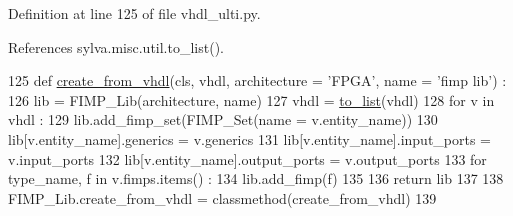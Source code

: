Definition at line 125 of file vhdl\+\_\+ulti.\+py.



References sylva.\+misc.\+util.\+to\+\_\+list().


\begin{DoxyCode}
125 \textcolor{keyword}{def }\hyperlink{namespacesylva_1_1misc_1_1vhdl__ulti_aeb869044a3abdaed35a68feec0f779fa}{create\_from\_vhdl}(cls, vhdl, architecture = 'FPGA', name = 'fimp lib') :
126   lib = FIMP\_Lib(architecture, name)
127   vhdl = \hyperlink{namespacesylva_1_1misc_1_1util_a03f5cfd365a10a5ec0567e320f987a9b}{to\_list}(vhdl)
128   \textcolor{keywordflow}{for} v \textcolor{keywordflow}{in} vhdl :
129     lib.add\_fimp\_set(FIMP\_Set(name = v.entity\_name))
130     lib[v.entity\_name].generics = v.generics
131     lib[v.entity\_name].input\_ports = v.input\_ports
132     lib[v.entity\_name].output\_ports = v.output\_ports
133     \textcolor{keywordflow}{for} type\_name, f \textcolor{keywordflow}{in} v.fimps.items() :
134       lib.add\_fimp(f)
135 
136   \textcolor{keywordflow}{return} lib
137 
138 FIMP\_Lib.create\_from\_vhdl = classmethod(create\_from\_vhdl)
139 \end{DoxyCode}
